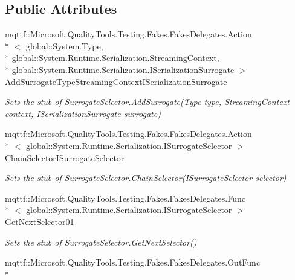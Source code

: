 \subsection*{Public Attributes}
\begin{DoxyCompactItemize}
\item 
mqttf\-::\-Microsoft.\-Quality\-Tools.\-Testing.\-Fakes.\-Fakes\-Delegates.\-Action\\*
$<$ global\-::\-System.\-Type, \\*
global\-::\-System.\-Runtime.\-Serialization.\-Streaming\-Context, \\*
global\-::\-System.\-Runtime.\-Serialization.\-I\-Serialization\-Surrogate $>$ \hyperlink{class_system_1_1_runtime_1_1_serialization_1_1_fakes_1_1_stub_surrogate_selector_a9e42a45651badc39b4a4829874de74a4}{Add\-Surrogate\-Type\-Streaming\-Context\-I\-Serialization\-Surrogate}
\begin{DoxyCompactList}\small\item\em Sets the stub of Surrogate\-Selector.\-Add\-Surrogate(\-Type type, Streaming\-Context context, I\-Serialization\-Surrogate surrogate)\end{DoxyCompactList}\item 
mqttf\-::\-Microsoft.\-Quality\-Tools.\-Testing.\-Fakes.\-Fakes\-Delegates.\-Action\\*
$<$ global\-::\-System.\-Runtime.\-Serialization.\-I\-Surrogate\-Selector $>$ \hyperlink{class_system_1_1_runtime_1_1_serialization_1_1_fakes_1_1_stub_surrogate_selector_a70f949c8c61b523dde0f97fdfdf63673}{Chain\-Selector\-I\-Surrogate\-Selector}
\begin{DoxyCompactList}\small\item\em Sets the stub of Surrogate\-Selector.\-Chain\-Selector(\-I\-Surrogate\-Selector selector)\end{DoxyCompactList}\item 
mqttf\-::\-Microsoft.\-Quality\-Tools.\-Testing.\-Fakes.\-Fakes\-Delegates.\-Func\\*
$<$ global\-::\-System.\-Runtime.\-Serialization.\-I\-Surrogate\-Selector $>$ \hyperlink{class_system_1_1_runtime_1_1_serialization_1_1_fakes_1_1_stub_surrogate_selector_a205d01385c4affae26cd907966ef8098}{Get\-Next\-Selector01}
\begin{DoxyCompactList}\small\item\em Sets the stub of Surrogate\-Selector.\-Get\-Next\-Selector()\end{DoxyCompactList}\item 
mqttf\-::\-Microsoft.\-Quality\-Tools.\-Testing.\-Fakes.\-Fakes\-Delegates.\-Out\-Func\\*

\end{DoxyCompactItemize}
